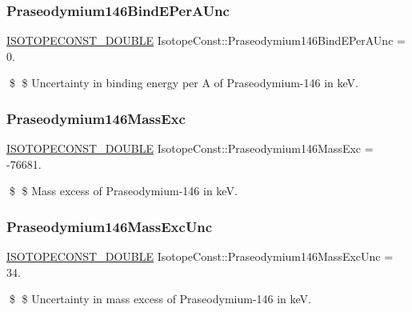 \subsubsection{\texorpdfstring{Praseodymium146\+Bind\+E\+Per\+A\+Unc}{Praseodymium146BindEPerAUnc}}
{\footnotesize\ttfamily \mbox{\hyperlink{group___isotope_const-_macros_ga8f45a7272ce02c0b4c65c44636ed719a}{I\+S\+O\+T\+O\+P\+E\+C\+O\+N\+S\+T\+\_\+\+D\+O\+U\+B\+LE}} Isotope\+Const\+::\+Praseodymium146\+Bind\+E\+Per\+A\+Unc = 0.}

\$ \$ Uncertainty in binding energy per A of Praseodymium-\/146 in keV. \mbox{\label{group___isotope_const-_praseodymium-_pr146_gaf9ec8fba1ec4003641889e9bdba61668}} 
\subsubsection{\texorpdfstring{Praseodymium146\+Mass\+Exc}{Praseodymium146MassExc}}
{\footnotesize\ttfamily \mbox{\hyperlink{group___isotope_const-_macros_ga8f45a7272ce02c0b4c65c44636ed719a}{I\+S\+O\+T\+O\+P\+E\+C\+O\+N\+S\+T\+\_\+\+D\+O\+U\+B\+LE}} Isotope\+Const\+::\+Praseodymium146\+Mass\+Exc = -\/76681.}

\$ \$ Mass excess of Praseodymium-\/146 in keV. \mbox{\label{group___isotope_const-_praseodymium-_pr146_gaca7859118d21956a2758bad13eecd4b9}} 
\subsubsection{\texorpdfstring{Praseodymium146\+Mass\+Exc\+Unc}{Praseodymium146MassExcUnc}}
{\footnotesize\ttfamily \mbox{\hyperlink{group___isotope_const-_macros_ga8f45a7272ce02c0b4c65c44636ed719a}{I\+S\+O\+T\+O\+P\+E\+C\+O\+N\+S\+T\+\_\+\+D\+O\+U\+B\+LE}} Isotope\+Const\+::\+Praseodymium146\+Mass\+Exc\+Unc = 34.}

\$ \$ Uncertainty in mass excess of Praseodymium-\/146 in keV. \mbox{\label{group___isotope_const-_praseodymium-_pr146_ga766b6e80d0c0e6a8abe722e2c2da4e98}} 

